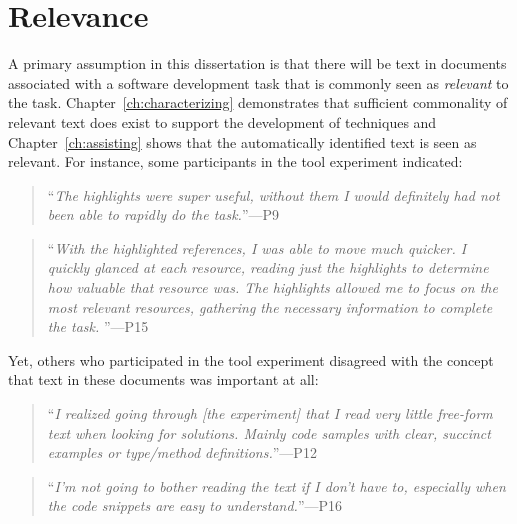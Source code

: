



\section{Relevance}
\label{cp7:relevance}

A primary assumption in this dissertation
is that there will be text in documents
associated with a software development
task that is commonly seen as \textit{relevant}
to the task. Chapter~\ref{ch:characterizing} demonstrates
that sufficient commonality of relevant
text does exist to support the development
of techniques and Chapter~\ref{ch:assisting} shows
that the automatically identified text
is seen as relevant. For instance,
some participants in the \acs{tool}
experiment indicated:

\smallskip
\begin{quote}
    ``\textit{The highlights were super useful, without them I would definitely had not been able to rapidly do the task.}''---P9
\end{quote}


\begin{quote}
``\textit{With the highlighted references, I was able to move much quicker. I quickly glanced at each resource, reading just the highlights to determine how valuable that resource was. The highlights allowed me to focus on the most relevant resources, gathering the necessary information to complete the task. 
}''---P15
\end{quote}

Yet, others who participated in the \acs{tool}
experiment disagreed with the concept that text
in these documents was important at all:





\smallskip
\begin{quote}
``\textit{I realized going through [the experiment] that I read very little free-form text when looking for solutions. Mainly code samples with clear, succinct examples or type/method definitions.}''---P12
\end{quote}

\begin{quote}
``\textit{I'm not going to bother reading the text if I don't have to, especially when the code snippets are easy to understand.}''---P16
\end{quote}




